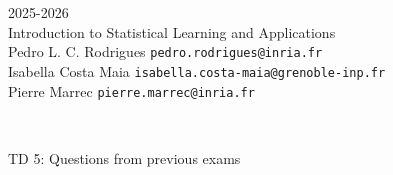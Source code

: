 \begin{flushleft}
 \hfill {} 2025-2026 \\
Introduction to Statistical Learning and Applications \\
Pedro L. C. Rodrigues   \hfill  \texttt{pedro.rodrigues@inria.fr} \\
Isabella Costa Maia \hfill \texttt{isabella.costa-maia@grenoble-inp.fr} \\
Pierre Marrec \hfill \texttt{pierre.marrec@inria.fr}

\HRuleTop\\
\begin{center}
\Large{TD 5: Questions from previous exams}
\end{center}
\HRuleBottom
\end{flushleft}
